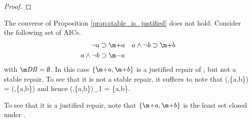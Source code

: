 {\begin{proof}
% 
% 
% 
% 
% 
% 
% 
%  
%  
%  
% 
% 
% 
% 
%  
%  
%  
%  
\end{proof}
}



\begin{example}\label{ex:justified_not_stable}
 The converse of Proposition \ref{prop:stable_is_justified} does not hold. Consider the following set \aics of AICs. 
 \begin{align*}
  \lnot a &\aicrule \add a &
  a\land \lnot b &\aicrule \add b\\
  a \land \lnot b &\aicrule \remove a
 \end{align*}
 with $\db=\emptyset$. 
 In this case $\{\add a,\add b\}$ is a justified repair of \fulldb, but not a stable repair. 
 To see that it is not a stable repair, it suffices to note that 
 \longpaper{\[}\shortpaper{$}
 \Ap(\emptyset,\{a,b\}) = (\emptyset,\{a,b\})
 \shortpaper{$}\longpaper{\]}
 and hence
  \longpaper{\[}\shortpaper{$}
  \lfp \Ap(\cdot,\{a,b\})_1 = \emptyset\neq \{a,b\}.
  \shortpaper{$}\longpaper{\]}
  
To see that it is a justified repair, note that $\{\add a,\add b\}$ is the least set closed under \aics. 
\end{example}

